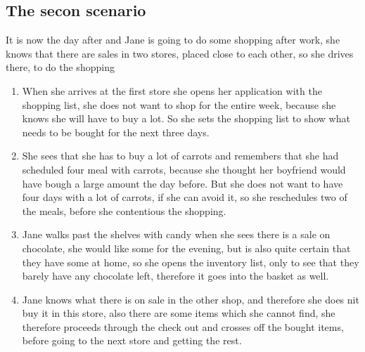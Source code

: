 \subsection{The secon scenario}
It is now the day after and Jane is going to do some shopping after work, she knows that there are sales in two stores, placed close to each other, so she drives there, to do the shopping
\begin{enumerate}
  \item When she arrives at the first store she opens her application with the shopping list, she does not want to shop for the entire week, because she knows she will have to buy a lot. So she sets the shopping list to show what needs to be bought for the next three days.
  \item She sees that she has to buy a lot of carrots and remembers that she had scheduled four meal with carrots, because she thought her boyfriend would have bough a large amount the day before. But she does not want to have four days with a lot of carrots, if she can avoid it, so she reschedules two of the meals, before she contentious the shopping.
  \item Jane walks past the shelves with candy when she sees there is a sale on chocolate, she would like some for the evening, but is also quite certain that they have some at home, so she opens the inventory list, only to see that they barely have any chocolate left, therefore it goes into the basket as well.
  \item Jane knows what there is on sale in the other shop, and therefore she does nit buy it in this store, also there are some items which she cannot find, she therefore proceeds through the check out and crosses off the bought items, before going to the next store and getting the rest.
\end{enumerate}

